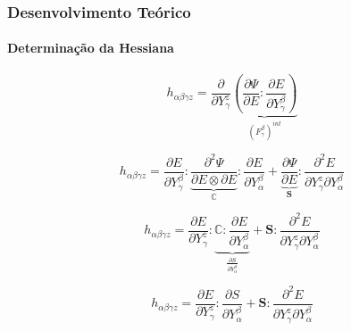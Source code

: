 \documentclass{beamer}
\begin{document}
\begin{frame}
    \frametitle{Desenvolvimento Teórico}
    \framesubtitle{Determinação da Hessiana}

    \begin{equation}
        h_{\alpha\beta\gamma z} =
        \frac{\partial}{\partial Y_\gamma^z} 
        \underbrace{\left(\frac{\partial \Psi}{\partial E} :\frac{\partial E}{\partial Y_\gamma^\beta}\right) }_{\left(F_\gamma^\beta\right)^{int}}
    \end{equation}

    \begin{equation}
        h_{\alpha\beta\gamma z} =
        \frac{\partial E}{\partial Y_\gamma^\beta} :\underbrace{\frac{\partial^2 \Psi}{\partial E \otimes \partial E}}_{\mathbb{C} } : \frac{\partial E}{\partial Y_\alpha^\beta}
        +
        \underbrace{\frac{\partial \Psi}{\partial E }}_{\mathbf{S} } :\frac{\partial^2 E}{\partial Y_\gamma^z \partial Y^\beta_\alpha}
    \end{equation}

    \begin{equation}
        h_{\alpha\beta\gamma z} =
        \frac{\partial E}{\partial Y_\gamma^z} :\underbrace{\mathbb{C} : \frac{\partial E}{\partial Y_\alpha^\beta}}_{\frac{\partial S}{\partial Y_\alpha^\beta}}
        +
        \mathbf{S} :\frac{\partial^2 E}{\partial Y_\gamma^z \partial Y^\beta_\alpha}
    \end{equation}

    \begin{equation}
        h_{\alpha\beta\gamma z} =
        \frac{\partial E}{\partial Y_\gamma^z} :\frac{\partial S}{\partial Y_\alpha^\beta}
        +
        \mathbf{S} :\frac{\partial^2 E}{\partial Y_\gamma^z \partial Y^\beta_\alpha}
    \end{equation}

\end{frame}
\end{document}
